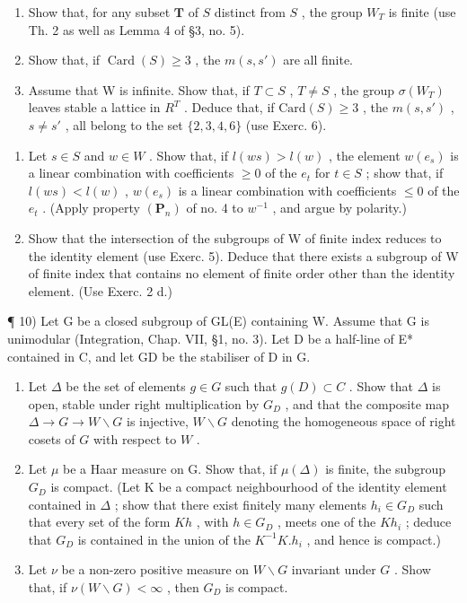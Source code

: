 \begin{enumerate}
\def\labelenumi{\alph{enumi})}
\item
  Show that, for any subset \(\mathbf{T}\) of \(S\) distinct from \(S\) , the group \(W_{T}\) is finite (use Th. 2 as well as Lemma 4 of §3, no. 5).
\item
  Show that, if \(\operatorname{Card}(S) \geqslant 3\) , the \(m(s, s')\) are all finite.
\item
  Assume that W is infinite. Show that, if \(T \subset S\) , \(T \neq S\) , the group \(\sigma(W_{T})\) leaves stable a lattice in \(R^{T}\) . Deduce that, if \(\text{Card}(S) \geqslant 3\) , the \(m(s, s')\) , \(s \neq s'\) , all belong to the set \(\{2, 3, 4, 6\}\) (use Exerc. 6).
\end{enumerate}

\begin{enumerate}
\def\labelenumi{\arabic{enumi})}
\setcounter{enumi}{7}
\item
  Let \(s \in S\) and \(w \in W\) . Show that, if \(l(ws) > l(w)\) , the element \(w(e_s)\) is a linear combination with coefficients \(\geqslant 0\) of the \(e_t\) for \(t \in S\) ; show that, if \(l(ws) < l(w)\) , \(w(e_s)\) is a linear combination with coefficients \(\leqslant 0\) of the \(e_t\) . (Apply property \((\mathbf{P}_n)\) of no. 4 to \(w^{-1}\) , and argue by polarity.)
\item
  Show that the intersection of the subgroups of W of finite index reduces to the identity element (use Exerc. 5). Deduce that there exists a subgroup of W of finite index that contains no element of finite order other than the identity element. (Use Exerc. 2 d.)
\end{enumerate}

¶ 10) Let G be a closed subgroup of GL(E) containing W. Assume that G is unimodular (Integration, Chap. VII, §1, no. 3). Let D be a half-line of E* contained in C, and let GD be the stabiliser of D in G.

\begin{enumerate}
\def\labelenumi{\alph{enumi})}
\item
  Let \(\Delta\) be the set of elements \(g \in G\) such that \(g(D) \subset C\) . Show that \(\Delta\) is open, stable under right multiplication by \(G_D\) , and that the composite map \(\Delta \to G \to W \backslash G\) is injective, \(W \backslash G\) denoting the homogeneous space of right cosets of \(G\) with respect to \(W\) .
\item
  Let \(\mu\) be a Haar measure on G. Show that, if \(\mu(\Delta)\) is finite, the subgroup \(G_{D}\) is compact. (Let K be a compact neighbourhood of the identity element contained in \(\Delta\) ; show that there exist finitely many elements \(h_i \in G_D\) such that every set of the form \(Kh\) , with \(h \in G_D\) , meets one of the \(Kh_i\) ; deduce that \(G_D\) is contained in the union of the \(K^{-1}K.h_i\) , and hence is compact.)
\item
  Let \(\nu\) be a non-zero positive measure on \(W\backslash G\) invariant under \(G\) . Show that, if \(\nu(W\backslash G) < \infty\) , then \(G_{D}\) is compact.
\end{enumerate}


